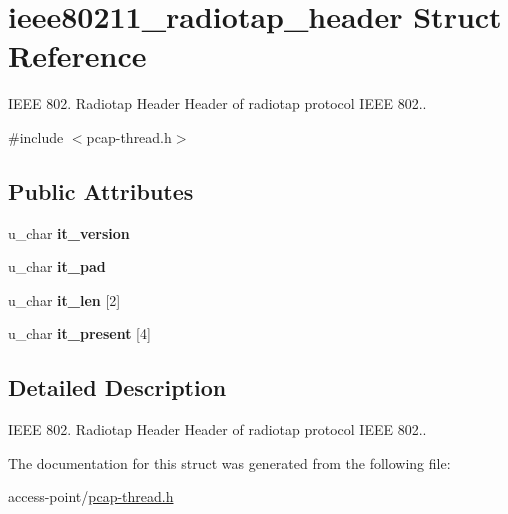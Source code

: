 \hypertarget{structieee80211__radiotap__header}{\section{ieee80211\-\_\-radiotap\-\_\-header Struct Reference}
\label{structieee80211__radiotap__header}
}


I\-E\-E\-E 802. Radiotap Header Header of radiotap protocol I\-E\-E\-E 802..  




{\ttfamily \#include $<$pcap-\/thread.\-h$>$}

\subsection*{Public Attributes}
\begin{DoxyCompactItemize}
\item 
\hypertarget{structieee80211__radiotap__header_a0c2d940a5b3d413e6beaa30cbe192943}{u\-\_\-char {\bfseries it\-\_\-version}}\label{structieee80211__radiotap__header_a0c2d940a5b3d413e6beaa30cbe192943}

\item 
\hypertarget{structieee80211__radiotap__header_a197bc8ad9b9ff289c17b97e2f4738f1f}{u\-\_\-char {\bfseries it\-\_\-pad}}\label{structieee80211__radiotap__header_a197bc8ad9b9ff289c17b97e2f4738f1f}

\item 
\hypertarget{structieee80211__radiotap__header_a947c98f2b58051ca730dea2ede65d091}{u\-\_\-char {\bfseries it\-\_\-len} \mbox{[}2\mbox{]}}\label{structieee80211__radiotap__header_a947c98f2b58051ca730dea2ede65d091}

\item 
\hypertarget{structieee80211__radiotap__header_a4a46520e815e3d2b7892ecfce6412693}{u\-\_\-char {\bfseries it\-\_\-present} \mbox{[}4\mbox{]}}\label{structieee80211__radiotap__header_a4a46520e815e3d2b7892ecfce6412693}

\end{DoxyCompactItemize}


\subsection{Detailed Description}
I\-E\-E\-E 802. Radiotap Header Header of radiotap protocol I\-E\-E\-E 802.. 

The documentation for this struct was generated from the following file\-:\begin{DoxyCompactItemize}
\item 
access-\/point/\hyperlink{pcap-thread_8h}{pcap-\/thread.\-h}\end{DoxyCompactItemize}
